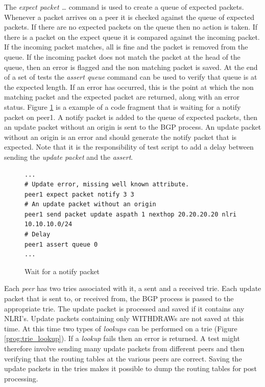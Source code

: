 \documentclass[11pt]{article}
\begin{document}
The {\em expect packet \ldots} command is used to create a queue of
expected packets. Whenever a packet arrives on a peer it is checked
against the queue of expected packets. If there are no expected packets
on the queue then no action is taken. If there is a packet on the
expect queue it is compared against the incoming packet. If the
incoming packet matches,
all is fine and the packet is removed from the queue. If the incoming
packet does not match the packet at the head of the queue, then an
error is flagged and the non matching packet is saved. At the end of a
set of tests the {\em assert queue} command can be used to verify that
queue is at the expected length. If an error has occurred, this is the
point at which the non matching packet and the expected packet are
returned, along with an error status. Figure \ref{prog:assert} is a
example of a code fragment that is waiting for a notify packet on
peer1. A notify packet is added to the queue of expected
packets, then an update packet without an origin is sent to the BGP
process. An update packet without an origin is an error and should
generate the notify packet that is expected. Note that it is
the responsibility of test script to add a delay between sending the
{\em update packet} and the {\em assert}.

\begin{figure}[htb]
\small
\begin{verbatim}
...
# Update error, missing well known attribute.
peer1 expect packet notify 3 3
# An update packet without an origin
peer1 send packet update aspath 1 nexthop 20.20.20.20 nlri 10.10.10.0/24
# Delay
peer1 assert queue 0
...
\end{verbatim}
\vspace{-0.1in}
\caption{\label{prog:assert}Wait for a notify packet}
\end{figure}

Each {\em peer} has two tries associated with it, a sent and a
received trie. Each update packet that is sent to, or received from,
the BGP process is passed to the appropriate trie. The update packet
is processed and saved if it contains any NLRI's. Update packets
containing only WITHDRAWs are not saved at this time. At this time two
types of {\em lookups} can be performed on a trie (Figure
\ref{prog:trie_lookup}). If a {\em lookup} fails then an error is
returned. A test might therefore involve sending many update packets
from different peers and then verifying that the routing tables at the
various peers are correct.  Saving the update packets in the tries
makes it possible to dump the routing tables for post processing.
\end{document}
